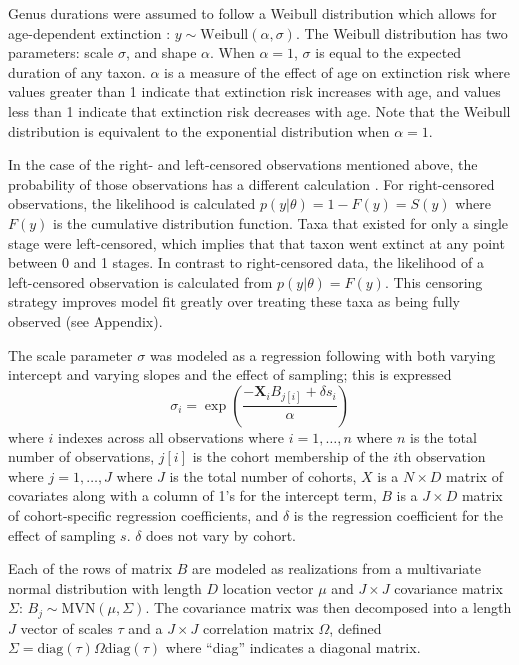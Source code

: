 \documentclass[11pt]{article}
\begin{document}
Genus durations were assumed to follow a Weibull distribution which allows for age-dependent extinction \citep{Klein2003}: \(y \sim \mathrm{Weibull}(\alpha, \sigma)\). The Weibull distribution has two parameters: scale \(\sigma\), and shape \(\alpha\). When \(\alpha = 1\), \(\sigma\) is equal to the expected duration of any taxon. \(\alpha\) is a measure of the effect of age on extinction risk where values greater than 1 indicate that extinction risk increases with age, and values less than 1 indicate that extinction risk decreases with age. Note that the Weibull distribution is equivalent to the exponential distribution when \(\alpha = 1\). 

In the case of the right- and left-censored observations mentioned above, the probability of those observations has a different calculation \citep{Klein2003}. For right-censored observations, the likelihood is calculated \(p(y | \theta) = 1 - F(y) = S(y)\) where \(F(y)\) is the cumulative distribution function. Taxa that existed for only a single stage were left-censored, which implies that that taxon went extinct at any point between 0 and 1 stages. In contrast to right-censored data, the likelihood of a left-censored observation is calculated from \(p(y | \theta) = F(y)\). This censoring strategy improves model fit greatly over treating these taxa as being fully observed (see Appendix). 

The scale parameter \(\sigma\) was modeled as a regression following \citet{Kleinbaum2005} with both varying intercept and varying slopes and the effect of sampling; this is expressed
\begin{equation}
  \sigma_{i} = \exp\left(\frac{-\mathbf{X}_{i} B_{j[i]} + \delta s_{i}}{\alpha}\right)
  \label{eq:sigma}
\end{equation}
where \(i\) indexes across all observations where \(i = 1, \dots, n\) where \(n\) is the total number of observations, \(j[i]\) is the cohort membership of the \(i\)th observation where \(j = 1, \dots, J\) where \(J\) is the total number of cohorts, \(X\) is a \(N \times D\) matrix of covariates along with a column of 1's for the intercept term, \(B\) is a \(J \times D\) matrix of cohort-specific regression coefficients, and \(\delta\) is the regression coefficient for the effect of sampling \(s\). \(\delta\) does not vary by cohort.

Each of the rows of matrix \(B\) are modeled as realizations from a multivariate normal distribution with length \(D\) location vector \(\mu\) and \(J \times J\) covariance matrix \(\Sigma\): \(B_{j} \sim \mathrm{MVN}(\mu, \Sigma)\). The covariance matrix was then decomposed into a length \(J\) vector of scales \(\tau\) and a \(J \times J\) correlation matrix \(\Omega\), defined \(\Sigma = \mathrm{diag}(\tau) \Omega \mathrm{diag}(\tau)\) where ``diag'' indicates a diagonal matrix.
\end{document}
